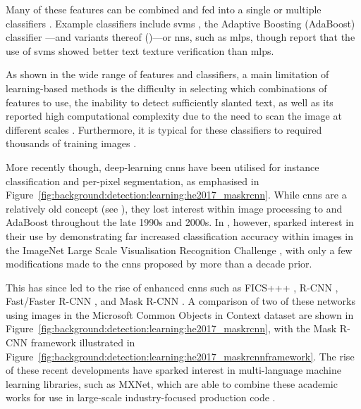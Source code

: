 Many of these features can be combined and fed into a single or multiple classifiers \citep{Pan:2010cj, Hanif:2008un, Hanif:2009tm, Gllavata:2004vq, Ye:2005wu, Wang:2009il, Tu:2003tg}. Example classifiers include \glspl{svm} \citep{Cortes:1995wa,Burges:1998wd,Vapnik:1999vu}, the Adaptive Boosting (AdaBoost) classifier \citep{Freund:1996uc}---and variants thereof (\citep{Friedman:2000jg,Hanif:2009tm,Sochman:2005dn})---or \glspl{nn}, such as \glspl{mlp}, though \citet{Chen:2004tja} report that the use of \glspl{svm} showed better text texture verification than \glspl{mlp}. 

As shown in the wide range of features and classifiers, a main limitation of learning-based methods is the difficulty in selecting which combinations of features to use, the inability to detect sufficiently slanted text, as well as its reported high computational complexity due to the need to scan the image at different scales \citep{Li:2012wd, Epshtein:2010tj}. Furthermore, it is typical for these classifiers to required thousands of training images \cite{Chen:2004ux}.

More recently though, deep-learning \glspl{cnn} have been utilised for instance classification and per-pixel segmentation, as emphasised in Figure~\ref{fig:background:detection:learning:he2017_maskrcnn}. While \glspl{cnn} are a relatively old concept (see \citet{Lecun:1998hy}), they lost interest within image processing to  and AdaBoost throughout the late 1990s and 2000s. In \citeyear{Krizhevsky:2012wl}, however, \citet{Krizhevsky:2012wl} sparked interest in their use by demonstrating far increased classification accuracy within images in the ImageNet Large Scale Visualisation Recognition Challenge \citep{JiaDeng:2009dl}, with only a few modifications made to the \glspl{cnn} proposed by \citeauthor{Lecun:1998hy} more than a decade prior. 

This has since led to the rise of enhanced \glspl{cnn} such as FICS+++ \citep{Li:2016uj}, R-CNN \citep{Girshick:2014jx}, Fast/Faster R-CNN \citep{Girshick:2015vr, Ren:2017ug}, and Mask R-CNN \citep{He:2017ud}. A comparison of two of these networks using images in the Microsoft Common Objects in Context \cite{Lin:2014vm} dataset are shown in Figure~\ref{fig:background:detection:learning:he2017_maskrcnn}, with the Mask R-CNN framework illustrated in Figure~\ref{fig:background:detection:learning:he2017_maskrcnnframework}. The rise of these recent developments have sparked interest in multi-language machine learning libraries, such as MXNet, which are able to combine these academic works for use in large-scale industry-focused production code \cite{Chen:2015vh}.


